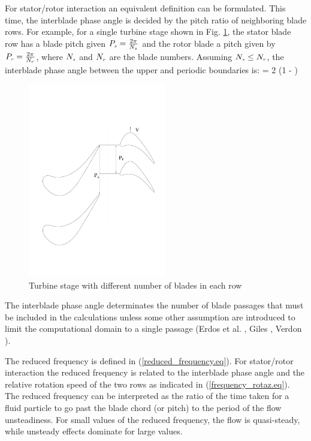  For stator/rotor interaction an equivalent definition can be formulated.
 This time, the interblade phase angle is decided by the pitch ratio
 of neighboring blade rows.
 For example, for a single turbine stage shown in Fig. \ref{turbine_stage.fig},
 the stator blade row has a blade pitch given $P_{\mbox{\tiny $s$}} = \frac{2 \pi}{N_{\mbox{\tiny $s$}}}$
 and the rotor blade a pitch given by
 $P_{\mbox{\tiny $r$}} = \frac{2 \pi}{N_{\mbox{\tiny $r$}}}$, where $N_{\mbox{\tiny $s$}}$ and $N_{\mbox{\tiny $r$}}$ are
 the blade numbers.
 Assuming $N_{\mbox{\tiny $s$}} \leq N_{\mbox{\tiny $r$}}$, the interblade phase angle between
 the upper and periodic boundaries is:
%
\beq
  \phi = 2 \pi\left(1 - \right)
  \label{ibps_forced}
\eeq
%
\begin{figure}[ht]
  \centerline{\includegraphics[width=60mm, clip=t]{CHAP_INTRO/FIGURE/turbine_stage.pdf}}
  \caption{Turbine stage with different number of blades in each row}
  \label{turbine_stage.fig}
\end{figure}
%
 The interblade phase angle determinates the number of blade passages that must
 be included in the calculations unless some other assumption
 are introduced to limit the computational domain to a single passage
 (Erdos et al. , Giles ,
  Verdon ).

 The reduced frequency is defined in (\ref{reduced_frequency.eq}).
 For stator/rotor interaction the reduced frequency is related to the
 interblade phase angle and the relative rotation speed of the two rows as
 indicated in (\ref{frequency_rotaz.eq}).
 The reduced frequency can be interpreted as the ratio of the time taken
 for a fluid particle to go past the blade chord (or pitch) to the
 period of the flow unsteadiness. For small values
 of the reduced frequency, the flow is quasi-steady, while
 unsteady effects dominate for large values.
%
